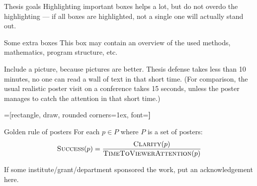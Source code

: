 \documentclass[portrait,a0paper,fontscale=0.25]{baposter}
\begin{document}
\begin{poster}
\begin{posterbox}[column=0, name=goals, below=background, headerColorOne=cyan!60, boxColorOne=cyan!20]{Thesis goals}
Highlighting important boxes helps a lot, but do not overdo the highlighting --- if all boxes are highlighted, not a single one will actually stand out.
\end{posterbox}

\begin{posterbox}[column=0, name=something1, below=goals]{Some extra boxes}
This box may contain an overview of the used methods, mathematics, program structure, etc.

Include a picture, because pictures are better. Thesis defense takes less than 10 minutes, no one can read a wall of text in that short time. (For comparison, the usual realistic poster visit on a conference takes 15 seconds, unless the poster manages to catch the attention in that short time.)

=[rectangle, draw, rounded corners=1ex, font=\huge\bfseries]
\begin{center}\end{center}

\end{posterbox}

\begin{posterbox}[column=0, name=something2, below=something1, headerColorOne=yellow!80!orange!95!black, boxColorOne=yellow!33]{Golden rule of posters}
For each $p \in P$ where $P$ is a set of posters:
$$ \textsc{Success}(p) = \frac{\textsc{Clarity}(p)}{\textsc{TimeToViewerAttention}(p)} $$
\end{posterbox}

%
%

\begin{posterbox}[column=0, span=2, name=footer, below=something2,
	textborder=none, headerborder=none, boxheaderheight=0pt,
	boxColorOne=black!3]{}
If some institute/grant/department sponsored the work, put an acknowledgement here.
\end{posterbox}

%
%
%


\end{poster}
\end{document}
